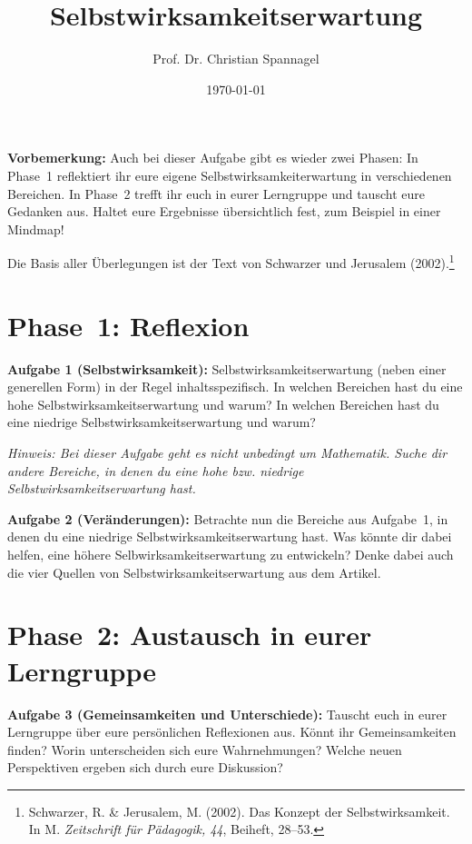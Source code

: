 \documentclass{../cssheet}
\title{Selbstwirksamkeitserwartung}
\author{Prof. Dr. Christian Spannagel}
\date{\today}
\begin{document}
\printtitle

\textbf{Vorbemerkung:}  Auch bei dieser Aufgabe gibt es wieder zwei Phasen: In Phase~1 reflektiert ihr eure eigene Selbstwirksamkeiterwartung in verschiedenen Bereichen. In Phase~2 trefft ihr euch in eurer Lerngruppe und tauscht eure Gedanken aus. Haltet eure Ergebnisse übersichtlich fest, zum Beispiel in einer Mindmap!

Die Basis aller Überlegungen ist der Text von Schwarzer und Jerusalem (2002).\footnote{Schwarzer, R. \& Jerusalem, M. (2002). Das Konzept der Selbstwirksamkeit. In M.  \emph{Zeitschrift für Pädagogik, 44}, Beiheft, 28--53.}

\section*{Phase~1: Reflexion}

\textbf{Aufgabe 1 (Selbstwirksamkeit):}  Selbstwirksamkeitserwartung (neben einer generellen Form) in der Regel inhaltsspezifisch. In welchen Bereichen hast du eine hohe Selbstwirksamkeitserwartung und warum? In welchen Bereichen hast du eine niedrige Selbstwirksamkeitserwartung und warum? 

\emph{Hinweis: Bei dieser Aufgabe geht es nicht unbedingt um Mathematik. Suche dir andere Bereiche, in denen du eine hohe bzw. niedrige Selbstwirksamkeitserwartung hast.}

\textbf{Aufgabe 2 (Veränderungen):} Betrachte nun die Bereiche aus Aufgabe~1, in denen du eine niedrige Selbstwirksamkeitserwartung hast. Was könnte dir dabei helfen, eine höhere Selbwirksamkeitserwartung zu entwickeln? Denke dabei auch die vier Quellen von Selbstwirksamkeitserwartung aus dem Artikel.


\section*{Phase~2: Austausch in eurer Lerngruppe}

\textbf{Aufgabe 3 (Gemeinsamkeiten und Unterschiede):} Tauscht euch in eurer Lerngruppe über eure persönlichen Reflexionen aus. Könnt ihr Gemeinsamkeiten finden? Worin unterscheiden sich eure Wahrnehmungen? Welche neuen Perspektiven ergeben sich durch eure Diskussion?


\vspace*{10mm}
\printlicense

\printsocials
\end{document}
